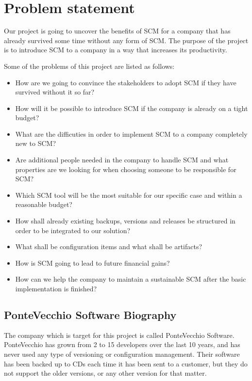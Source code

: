 \documentclass[10pt]{article}
\begin{document}
\section{Problem statement}
Our project is going to uncover the benefits of SCM for a company that has already survived some time without any form of SCM. The purpose of the project is to introduce SCM to a company in a way that increases its productivity.

\hfill \break
\noindent Some of the problems of this project are  listed as follows:
\begin{itemize}
\item How are we going to convince the stakeholders to adopt SCM if they have survived without it so far?
\item How will it be possible to introduce SCM if the company is already on a tight budget?
\item What are the difficuties in order to implement SCM to a company completely new to SCM?
\item Are additional people needed in the company to handle SCM and what properties are we looking for when choosing someone to be responsible for SCM?
\item Which SCM tool will be the most suitable for our specific case and within a reasonable budget?
\item How shall already existing backups, versions and releases be structured in order to be integrated to our solution?
\item What shall be configuration items and what shall be artifacts?
\item How is SCM going to lead to future financial gains?
\item How can we help the company to maintain a sustainable SCM after the basic implementation is finished?
\end{itemize}

\subsection{PonteVecchio Software Biography}
The company which is target for this project is called PonteVecchio Software. PonteVecchio has grown from 2 to 15 developers over the last 10 years, and has never used any type of versioning or configuration management. Their software has been backed up to CDs each time it has been sent to a customer, but they do not support the older versions, or any other version for that matter. 
\end{document}
